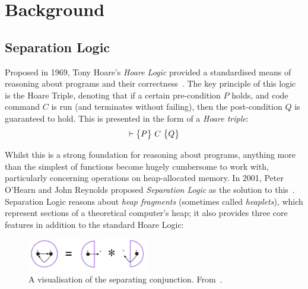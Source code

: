
\chapter{Background}
\label{sec:background}

\section{Separation Logic}

Proposed in 1969, Tony Hoare's \textit{Hoare Logic} provided a standardised
means of reasoning about programs and their correctness~\cite{hoare}. The key
principle of this logic is the Hoare Triple, denoting that if a certain
pre-condition $P$ holds, and code command $C$ is run (and terminates without
failing), then the post-condition $Q$ is guaranteed to hold. This is presented
in the form of a \textit{Hoare triple}:
$$
  \triple{P}{C}{Q}
$$

Whilst this is a strong foundation for reasoning about programs, anything more
than the simplest of functions become hugely cumbersome to work with,
particularly concerning operations on heap-allocated memory. In 2001, Peter
O'Hearn and John Reynolds proposed \textit{Separation Logic} as the solution to
this~\cite{separation-logic}. Separation Logic reasons about
\textit{heap fragments} (sometimes called \textit{heaplets}), which represent
sections of a theoretical computer's heap; it also provides three core features
in addition to the standard Hoare Logic:

\begin{figure}[!b]
  \centering
  \includegraphics[width=200px]{img/separating-conjunction.jpg}
  \caption{
    A visualisation of the separating conjunction.
    From~\cite{infer-sl}.
  }
  \label{fig:separating-conjunction}
\end{figure}

